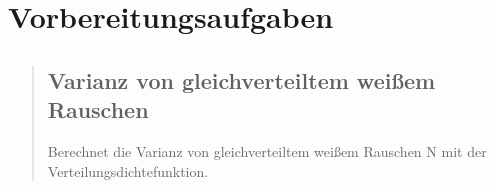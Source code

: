 %     




\section{Vorbereitungsaufgaben}
\begin{quote}
    \hspace{-2em}
    \subsection{Varianz von gleichverteiltem weißem Rauschen}
    Berechnet die Varianz von gleichverteiltem weißem Rauschen N mit der Verteilungsdichtefunktion.\\
    \begin{quote}
    
    \end{quote}
      
\end{quote}



